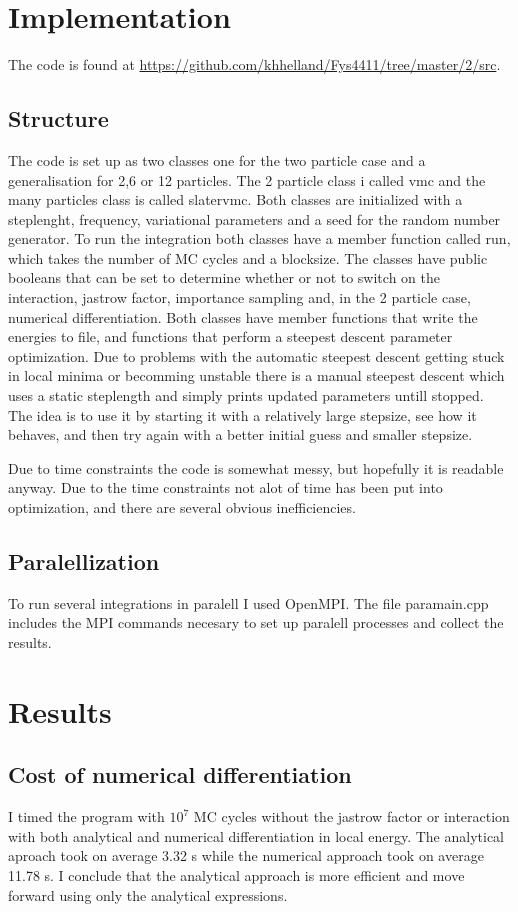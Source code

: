 \documentclass[a4paper,English,10pt]{article}
\begin{document}
\section{Implementation}
The code is found at \url{https://github.com/khhelland/Fys4411/tree/master/2/src}.

\subsection{Structure}
The code is set up as two classes one for the two particle case and a generalisation for 2,6 or 12 particles.
The 2 particle class i called vmc and the many particles class is called slatervmc. Both classes are initialized with a steplenght, frequency,
variational parameters and a seed for the random number generator. To run the integration both classes have a member function called run, which takes
the number of MC cycles and a blocksize. The classes have public booleans that can be set to determine whether or not to switch on the interaction,
jastrow factor, importance sampling and, in the 2 particle case, numerical differentiation. Both classes have member functions that write the energies to file,
and functions that perform a steepest descent parameter optimization. Due to problems with the automatic steepest descent getting stuck in local minima or becomming unstable
there is a manual steepest descent which uses a static steplength and simply prints updated parameters untill stopped. The idea is to use it by starting it with a relatively large
stepsize, see how it behaves, and then try again with a better initial guess and smaller stepsize.

Due to time constraints the code is somewhat messy, but hopefully it is readable anyway.
Due to the time constraints not alot of time has been put into optimization, and there are several obvious inefficiencies.

\subsection{Paralellization}

To run several integrations in paralell I used OpenMPI. The file paramain.cpp includes the MPI commands necesary to set up paralell processes and collect the results.


\section{Results}
\subsection{Cost of numerical differentiation}
I timed the program with $10^7$ MC cycles without the jastrow factor or interaction with both analytical and numerical differentiation in local energy.
The analytical aproach took on average 3.32 s while the numerical approach took on average 11.78 s. I conclude that the analytical approach is more efficient and move forward
using only the analytical expressions.
\end{document}
